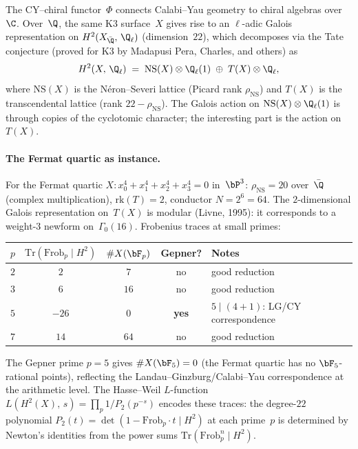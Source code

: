 The CY--chiral functor~$\Phi$ connects Calabi--Yau geometry to chiral algebras over~$\C$. Over~$\Q$, the same K3 surface~$X$ gives rise to an $\ell$-adic Galois representation on $H^2(X_{\bar{\Q}},\, \Q_\ell)$ (dimension~$22$), which decomposes via the Tate conjecture (proved for K3 by Madapusi Pera, Charles, and others) as
\[
 H^2(X,\, \Q_\ell) \;=\; \mathrm{NS}(X) \otimes \Q_\ell(1) \;\oplus\; T(X) \otimes \Q_\ell,
\]
where $\mathrm{NS}(X)$ is the N\'eron--Severi lattice (Picard rank $\rho_{\mathrm{NS}}$) and $T(X)$ is the transcendental lattice (rank $22 - \rho_{\mathrm{NS}}$). The Galois action on $\mathrm{NS}(X) \otimes \Q_\ell(1)$ is through copies of the cyclotomic character; the interesting part is the action on~$T(X)$.

\paragraph{The Fermat quartic as instance.}
For the Fermat quartic $X\colon x_0^4 + x_1^4 + x_2^4 + x_3^4 = 0$ in~$\bP^3$: $\rho_{\mathrm{NS}} = 20$ over~$\bar{\Q}$ (complex multiplication), $\mathrm{rk}(T) = 2$, conductor $N = 2^6 = 64$. The $2$-dimensional Galois representation on~$T(X)$ is modular (Livne, 1995): it corresponds to a weight-$3$ newform on~$\Gamma_0(16)$. Frobenius traces at small primes:
\begin{center}
\begin{tabular}{ccccl}
$p$ & $\mathrm{Tr}(\mathrm{Frob}_p \mid H^2)$ & $\#X(\bF_p)$ & Gepner? & Notes \\
\hline
$2$ & $2$ & $7$ & no & good reduction \\
$3$ & $6$ & $16$ & no & good reduction \\
$5$ & $-26$ & $0$ & \textbf{yes} & $5 \mid (4+1)$: LG/CY correspondence \\
$7$ & $14$ & $64$ & no & good reduction
\end{tabular}
\end{center}
The Gepner prime $p = 5$ gives $\#X(\bF_5) = 0$ (the Fermat quartic has no $\bF_5$-rational points), reflecting the Landau--Ginzburg/Calabi--Yau correspondence at the arithmetic level. The Hasse--Weil $L$-function $L(H^2(X),\, s) = \prod_p 1/P_2(p^{-s})$ encodes these traces: the degree-$22$ polynomial $P_2(t) = \det(1 - \mathrm{Frob}_p \cdot t \mid H^2)$ at each prime~$p$ is determined by Newton's identities from the power sums $\mathrm{Tr}(\mathrm{Frob}_p^n \mid H^2)$.

